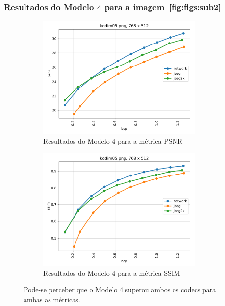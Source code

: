 \documentclass{beamer}
\begin{document}
\begin{frame}
\frametitle{Resultados do Modelo 4 para a imagem~\ref{fig:figs:sub2}}
\begin{figure}
\centering
\begin{subfigure}{.5\textwidth}
  \centering
  \includegraphics[width=0.9\textwidth]{figs/kodim05_plot_psnr.pdf}
  \caption{Resultados do Modelo 4 para a métrica PSNR}
  \label{fig:mod4_4:sub1}
\end{subfigure}%
\begin{subfigure}{.5\textwidth}
  \centering
  \includegraphics[width=0.9\textwidth]{figs/kodim05_plot_ssim.pdf}
  \caption{Resultados do Modelo 4 para a métrica SSIM}
  \label{fig:mod4_4:sub2}
\end{subfigure}
\caption{Pode-se perceber que o Modelo 4 superou ambos os codecs para ambas as métricas. }
\label{fig:mod4_4}
\end{figure}
\end{frame}
\end{document}

